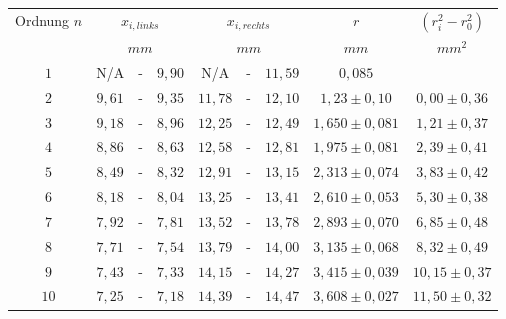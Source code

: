 \begin{tabular}{c|ccc|ccc|c|c} 
Ordnung \(n\) & \multicolumn{3}{c|}{\(x_{i,links}\)} & \multicolumn{3}{c|}{\(x_{i,rechts}\)} & \(r\) & \(\left( r_i^2 - r_0^2 \right)\)\\
& \multicolumn{3}{c|}{\(mm\)} & \multicolumn{3}{c|}{\(mm\)}  & \(mm\) & \(mm^2\) \\ \hline
\(1\) & N/A & - & \(9,90\) & N/A & - & \(11,59\) & \(0,085\) & \\ 
\(2\) & \(9,61\) & - & \(9,35\) & \(11,78\)  & - & \(12,10\) & \(1,23\pm 0,10\) & \(0,00\pm 0,36\)\\ 
\(3\) & \(9,18\) & - & \(8,96\) & \(12,25\)  & - & \(12,49\) & \(1,650\pm 0,081\) & \(1,21\pm 0,37\)\\ 
\(4\) & \(8,86\) & - & \(8,63\) & \(12,58\)  & - & \(12,81\) & \(1,975\pm 0,081\) & \(2,39\pm 0,41\)\\ 
\(5\) & \(8,49\) & - & \(8,32\) & \(12,91\)  & - & \(13,15\) & \(2,313\pm 0,074\) & \(3,83\pm 0,42\)\\ 
\(6\) & \(8,18\) & - & \(8,04\) & \(13,25\)  & - & \(13,41\) & \(2,610\pm 0,053\) & \(5,30\pm 0,38\)\\ 
\(7\) & \(7,92\) & - & \(7,81\) & \(13,52\)  & - & \(13,78\) & \(2,893\pm 0,070\) & \(6,85\pm 0,48\)\\ 
\(8\) & \(7,71\) & - & \(7,54\) & \(13,79\)  & - & \(14,00\) & \(3,135\pm 0,068\) & \(8,32\pm 0,49\)\\ 
\(9\) & \(7,43\) & - & \(7,33\) & \(14,15\)  & - & \(14,27\) & \(3,415\pm 0,039\) & \(10,15\pm 0,37\)\\ 
\(10\) & \(7,25\) & - & \(7,18\) & \(14,39\)  & - & \(14,47\) & \(3,608\pm 0,027\) & \(11,50\pm 0,32\)\\ 

\end{tabular}